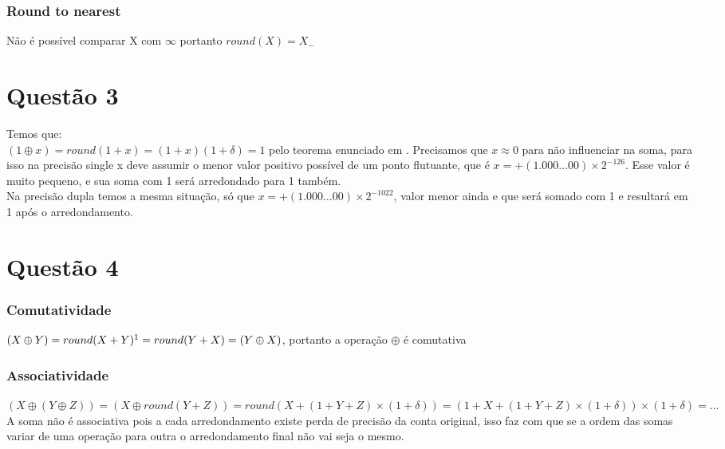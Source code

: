       \subsubsection*{Round to nearest}
        Não é possível comparar X com $\infty$ portanto $round(X) = X_{-}$


  \newpage
  
  \section{Questão 3}
  \label{sec:question3}

    Temos que: \\

    $(1 \oplus x) = round(1 + x) = (1 + x)(1 + \delta) = 1$ pelo teorema enunciado em \cite{numericalIEEE}. Precisamos que $x \approx 0$ para não influenciar na soma, para isso na precisão single x deve assumir o menor valor positivo possível de um ponto flutuante, que é $x = +(1.000 \dots 00) \times 2^{-126}$. Esse valor é muito pequeno, e sua soma com 1 será arredondado para 1 também. \\

    Na precisão dupla temos a mesma situação, só que $x = +(1.000 \dots 00) \times 2^{-1022}$, valor menor ainda e que será somado com 1 e resultará em 1 após o arredondamento.

  \section{Questão 4}
  \label{sec:question4}

    \subsubsection*{Comutatividade}
      $(X \oplus Y) = round(X + Y)\footnote{Comutatividade aritmética} = round(Y + X) = (Y \oplus X)$, portanto a operação $\oplus$ é comutativa

    \subsubsection*{Associatividade}

      $(X \oplus (Y \oplus Z)) = (X \oplus round(Y + Z)) = round(X + (1 + Y + Z) \times (1 + \delta )) = (1 + X + (1 + Y + Z) \times (1 + \delta )) \times (1 + \delta ) = \dots$ \\

      A soma não é associativa pois a cada arredondamento existe perda de precisão da conta original, isso faz com que se a ordem das somas variar de uma operação para outra o arredondamento final não vai seja o mesmo.


